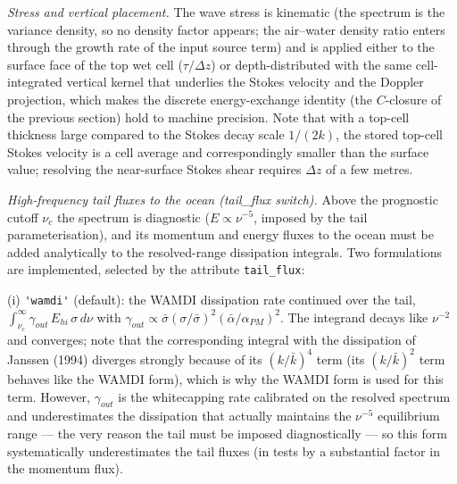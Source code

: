 \documentclass[12pt]{article}
\begin{document}
\emph{Stress and vertical placement.} The wave stress is kinematic
(the spectrum is the variance density, so no density factor appears; the
air--water density ratio enters through the growth rate of the input source
term) and is applied either to the surface face of the top wet cell
($\tau/\Delta z$) or depth-distributed with the same cell-integrated vertical
kernel that underlies the Stokes velocity and the Doppler projection, which
makes the discrete energy-exchange identity (the $C$-closure of the previous
section) hold to machine precision. Note that with a top-cell thickness large
compared to the Stokes decay scale $1/(2k)$, the stored top-cell Stokes
velocity is a cell average and correspondingly smaller than the surface value;
resolving the near-surface Stokes shear requires $\Delta z$ of a few metres.

\emph{High-frequency tail fluxes to the ocean (tail\_flux switch).} Above
the prognostic cutoff $\nu_c$ the spectrum is diagnostic ($E \propto \nu^{-5}$,
imposed by the tail parameterisation), and its momentum and energy fluxes to
the ocean must be added analytically to the resolved-range dissipation
integrals. Two formulations are implemented, selected by the attribute
\verb|tail_flux|:

(i) \verb|'wamdi'| (default): the WAMDI dissipation rate
continued over the tail,
$\int_{\nu_c}^\infty \gamma_{out}\,E_{hi}\, \sigma\, d\nu$ with $\gamma_{out} \propto
\bar\sigma (\sigma/\bar\sigma)^2 (\bar\alpha/\alpha_{PM})^2$. The integrand
decays like $\nu^{-2}$ and converges; note that the corresponding integral with
the dissipation of Janssen (1994) diverges strongly because of its
$(k/\bar k)^4$ term (its $(k/\bar k)^2$ term behaves like the WAMDI form),
which is why the WAMDI form is used for this term. However,
$\gamma_{out}$ is the whitecapping rate calibrated on the resolved spectrum and
underestimates the dissipation that actually maintains the $\nu^{-5}$
equilibrium range --- the very reason the tail must be imposed diagnostically
--- so this form systematically underestimates the tail fluxes (in tests by
a substantial factor in the momentum flux).
\end{document}
